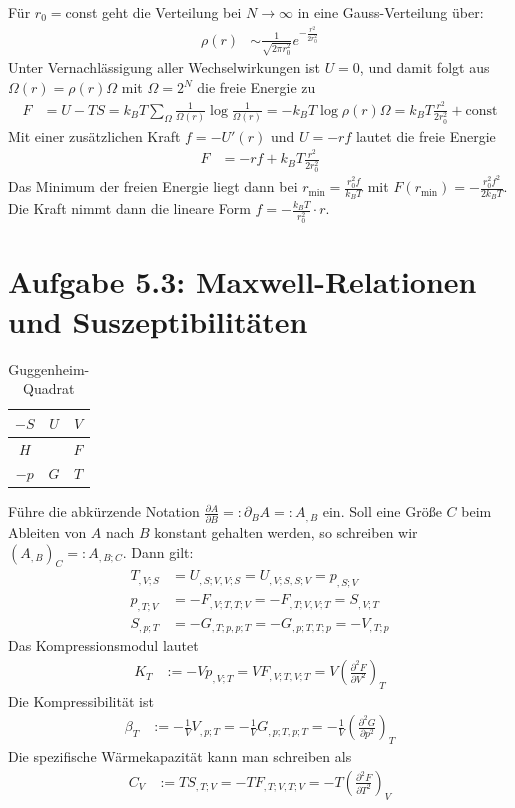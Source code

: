 \documentclass[a4paper,12pt]{article}
\newcommand{\kla}{}
\newcommand{\tecxt}{}
\begin{document}
Für $r_0=$const geht die Verteilung bei $N\rightarrow\infty$ in eine Gauss-Verteilung über:
\begin{align*}
\rho(r)&\sim\frac{1}{\sqrt{2\pi r_0^2}}e^{-\frac{r^2}{2r_0^2}}
\end{align*}
Unter Vernachlässigung aller Wechselwirkungen ist $U=0$, und damit folgt aus $\Omega(r)=\rho(r)\Omega$ mit $\Omega=2^N$ die freie Energie zu
\begin{align*}
F&=U-TS=k_BT\sum_\Omega\frac{1}{\Omega(r)}\log\frac{1}{\Omega(r)}=-k_BT\log\rho(r)\Omega=k_BT\frac{r^2}{2r_0^2}+\tecxt\text{const}
\end{align*}
Mit einer zusätzlichen Kraft $f=-U'(r)$ und $U=-rf$ lautet die freie Energie
\begin{align*}
F&=-rf+k_BT\frac{r^2}{2r_0^2}
\end{align*} 
Das Minimum der freien Energie liegt dann bei $r_\tecxt\text{min}=\frac{r_0^2f}{k_BT}$ mit $F(r_\tecxt\text{min})=-\frac{r_0^2f^2}{2k_BT}$. Die Kraft nimmt dann die lineare Form $f=-\frac{k_BT}{r_0^2}\cdot r$.
\section*{Aufgabe 5.3: Maxwell-Relationen und Suszeptibilitäten}
\begin{table}[h!]
\centering
\begin{tabular}{c|c|c}
$-S$&$U$&$V$\\ \hline $H$&&$F$\\ \hline $-p$&$G$&$T$\\
\end{tabular}
\caption{Guggenheim-Quadrat}
\end{table}
Führe die abkürzende Notation $\frac{\partial A}{\partial B}=:\partial_BA=:A_{,B}$ ein. Soll eine Größe $C$ beim Ableiten von $A$ nach $B$ konstant gehalten werden, so schreiben wir $\kla\left( {A_{,B}} \right)_{C}=:A_{,B;C}$. Dann gilt:
\begin{align*}
T_{,V;S}&=U_{,S;V,V;S}=U_{,V;S,S;V}=p_{,S;V}\\
p_{,T;V}&=-F_{,V;T,T;V}=-F_{,T;V,V;T}=S_{,V;T}\\
S_{,p;T}&=-G_{,T;p,p;T}=-G_{,p;T,T;p}=-V_{,T;p}
\end{align*}
Das Kompressionsmodul lautet
\begin{align*}
K_T&:=-Vp_{,V;T}=VF_{,V;T,V;T}=V\kla\left( {\frac{\partial^2 F}{\partial V^2}} \right)_{T}
\end{align*}
Die Kompressibilität ist
\begin{align*}
\beta_T&:=-\frac{1}{V}V_{,p;T}=-\frac{1}{V}G_{,p;T,p;T}=-\frac{1}{V}\kla\left( {\frac{\partial^2G}{\partial p^2}} \right)_{T}
\end{align*}
Die spezifische Wärmekapazität kann man schreiben als
\begin{align*}
C_V&:=TS_{,T;V}=-TF_{,T;V,T;V}=-T\kla\left( {\frac{\partial^2F}{\partial T^2}} \right)_{V}
\end{align*}
\end{document}
